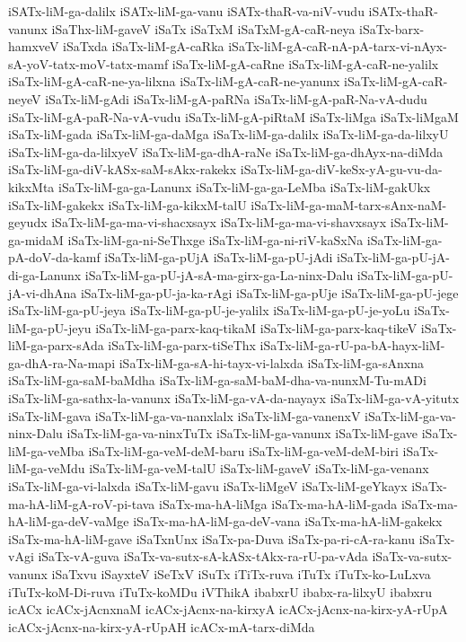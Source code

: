 {iSATx-liM-ga-dalilx
iSATx-liM-ga-vanu
iSATx-thaR-va-niV-vudu
iSATx-thaR-vanunx
iSaThx-liM-gaveV
iSaTx
iSaTxM
iSaTxM-gA-caR-neya
iSaTx-barx-hamxveV
iSaTxda
iSaTx-liM-gA-caRka
iSaTx-liM-gA-caR-nA-pA-tarx-vi-nAyx-sA-yoV-tatx-moV-tatx-mamf
iSaTx-liM-gA-caRne
iSaTx-liM-gA-caR-ne-yalilx
iSaTx-liM-gA-caR-ne-ya-lilxna
iSaTx-liM-gA-caR-ne-yanunx
iSaTx-liM-gA-caR-neyeV
iSaTx-liM-gAdi
iSaTx-liM-gA-paRNa
iSaTx-liM-gA-paR-Na-vA-dudu
iSaTx-liM-gA-paR-Na-vA-vudu
iSaTx-liM-gA-piRtaM
iSaTx-liMga
iSaTx-liMgaM
iSaTx-liM-gada
iSaTx-liM-ga-daMga
iSaTx-liM-ga-dalilx
iSaTx-liM-ga-da-lilxyU
iSaTx-liM-ga-da-lilxyeV
iSaTx-liM-ga-dhA-raNe
iSaTx-liM-ga-dhAyx-na-diMda
iSaTx-liM-ga-diV-kASx-saM-sAkx-rakekx
iSaTx-liM-ga-diV-keSx-yA-gu-vu-da-kikxMta
iSaTx-liM-ga-ga-Lanunx
iSaTx-liM-ga-ga-LeMba
iSaTx-liM-gakUkx
iSaTx-liM-gakekx
iSaTx-liM-ga-kikxM-talU
iSaTx-liM-ga-maM-tarx-sAnx-naM-geyudx
iSaTx-liM-ga-ma-vi-shacxsayx
iSaTx-liM-ga-ma-vi-shavxsayx
iSaTx-liM-ga-midaM
iSaTx-liM-ga-ni-SeThxge
iSaTx-liM-ga-ni-riV-kaSxNa
iSaTx-liM-ga-pA-doV-da-kamf
iSaTx-liM-ga-pUjA
iSaTx-liM-ga-pU-jAdi
iSaTx-liM-ga-pU-jA-di-ga-Lanunx
iSaTx-liM-ga-pU-jA-sA-ma-girx-ga-La-ninx-Dalu
iSaTx-liM-ga-pU-jA-vi-dhAna
iSaTx-liM-ga-pU-ja-ka-rAgi
iSaTx-liM-ga-pUje
iSaTx-liM-ga-pU-jege
iSaTx-liM-ga-pU-jeya
iSaTx-liM-ga-pU-je-yalilx
iSaTx-liM-ga-pU-je-yoLu
iSaTx-liM-ga-pU-jeyu
iSaTx-liM-ga-parx-kaq-tikaM
iSaTx-liM-ga-parx-kaq-tikeV
iSaTx-liM-ga-parx-sAda
iSaTx-liM-ga-parx-tiSeThx
iSaTx-liM-ga-rU-pa-bA-hayx-liM-ga-dhA-ra-Na-mapi
iSaTx-liM-ga-sA-hi-tayx-vi-lalxda
iSaTx-liM-ga-sAnxna
iSaTx-liM-ga-saM-baMdha
iSaTx-liM-ga-saM-baM-dha-va-nunxM-Tu-mADi
iSaTx-liM-ga-sathx-la-vanunx
iSaTx-liM-ga-vA-da-nayayx
iSaTx-liM-ga-vA-yitutx
iSaTx-liM-gava
iSaTx-liM-ga-va-nanxlalx
iSaTx-liM-ga-vanenxV
iSaTx-liM-ga-va-ninx-Dalu
iSaTx-liM-ga-va-ninxTuTx
iSaTx-liM-ga-vanunx
iSaTx-liM-gave
iSaTx-liM-ga-veMba
iSaTx-liM-ga-veM-deM-baru
iSaTx-liM-ga-veM-deM-biri
iSaTx-liM-ga-veMdu
iSaTx-liM-ga-veM-talU
iSaTx-liM-gaveV
iSaTx-liM-ga-venanx
iSaTx-liM-ga-vi-lalxda
iSaTx-liM-gavu
iSaTx-liMgeV
iSaTx-liM-geYkayx
iSaTx-ma-hA-liM-gA-roV-pi-tava
iSaTx-ma-hA-liMga
iSaTx-ma-hA-liM-gada
iSaTx-ma-hA-liM-ga-deV-vaMge
iSaTx-ma-hA-liM-ga-deV-vana
iSaTx-ma-hA-liM-gakekx
iSaTx-ma-hA-liM-gave
iSaTxnUnx
iSaTx-pa-Duva
iSaTx-pa-ri-cA-ra-kanu
iSaTx-vAgi
iSaTx-vA-guva
iSaTx-va-sutx-sA-kASx-tAkx-ra-rU-pa-vAda
iSaTx-va-sutx-vanunx
iSaTxvu
iSayxteV
iSeTxV
iSuTx
iTiTx-ruva
iTuTx
iTuTx-ko-LuLxva
iTuTx-koM-Di-ruva
iTuTx-koMDu
iVThikA
ibabxrU
ibabx-ra-lilxyU
ibabxru
icACx
icACx-jAcnxnaM
icACx-jAcnx-na-kirxyA
icACx-jAcnx-na-kirx-yA-rUpA
icACx-jAcnx-na-kirx-yA-rUpAH
icACx-mA-tarx-diMda
}
